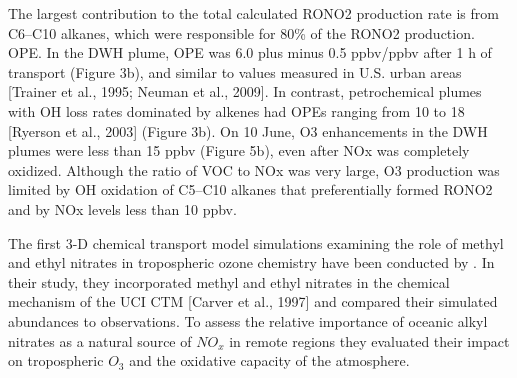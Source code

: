 \documentclass[11pt,a4paper]{article}
\begin{document}
The largest contribution to the total calculated RONO2 production rate is from C6–C10 alkanes, which were responsible for 80\% of the RONO2 production.
OPE. In the DWH plume, OPE was 6.0 plus minus 0.5 ppbv/ppbv after 1 h of transport (Figure 3b), and similar to values measured in U.S. urban areas [Trainer et al., 1995; Neuman et al., 2009]. In contrast, petrochemical plumes with OH loss rates dominated by alkenes had OPEs ranging from 10 to 18 [Ryerson et al., 2003] (Figure 3b). On 10 June, O3 enhancements in the DWH plumes were less than 15 ppbv (Figure 5b), even after NOx was completely oxidized. Although the ratio of VOC to NOx was very large, O3 production was limited by OH oxidation of C5–C10 alkanes that preferentially formed RONO2 and by NOx levels less than 10 ppbv.


The first 3-D chemical transport  model simulations examining the role of methyl and ethyl nitrates in tropospheric ozone chemistry have been conducted by \citep{Neu2008}. In their study, they incorporated methyl and ethyl nitrates in the chemical mechanism of the UCI CTM [Carver et al., 1997] and compared their simulated abundances to observations. To assess  the relative importance of
oceanic alkyl nitrates as a natural source of $NO_x$ in remote regions they evaluated their impact on tropospheric $O_3$ and the oxidative capacity of the atmosphere.
\end{document}
